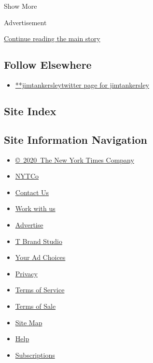 Show More

Advertisement

\protect\hyperlink{after-mid2}{Continue reading the main story}

\hypertarget{follow-elsewhere}{%
\subsection{Follow Elsewhere}\label{follow-elsewhere}}

\begin{itemize}
\tightlist
\item
  \href{https://twitter.com/jimtankersley}{**jimtankersleytwitter page
  for jimtankersley}
\end{itemize}

\hypertarget{site-index}{%
\subsection{Site Index}\label{site-index}}

\hypertarget{site-information-navigation}{%
\subsection{Site Information
Navigation}\label{site-information-navigation}}

\begin{itemize}
\tightlist
\item
  \href{https://help.nytimes.com/hc/en-us/articles/115014792127-Copyright-notice}{©~2020~The
  New York Times Company}
\end{itemize}

\begin{itemize}
\tightlist
\item
  \href{https://www.nytco.com/}{NYTCo}
\item
  \href{https://help.nytimes.com/hc/en-us/articles/115015385887-Contact-Us}{Contact
  Us}
\item
  \href{https://www.nytco.com/careers/}{Work with us}
\item
  \href{https://nytmediakit.com/}{Advertise}
\item
  \href{http://www.tbrandstudio.com/}{T Brand Studio}
\item
  \href{https://www.nytimes.com/privacy/cookie-policy\#how-do-i-manage-trackers}{Your
  Ad Choices}
\item
  \href{https://www.nytimes.com/privacy}{Privacy}
\item
  \href{https://help.nytimes.com/hc/en-us/articles/115014893428-Terms-of-service}{Terms
  of Service}
\item
  \href{https://help.nytimes.com/hc/en-us/articles/115014893968-Terms-of-sale}{Terms
  of Sale}
\item
  \href{https://spiderbites.nytimes.com}{Site Map}
\item
  \href{https://help.nytimes.com/hc/en-us}{Help}
\item
  \href{https://www.nytimes.com/subscription?campaignId=37WXW}{Subscriptions}
\end{itemize}
